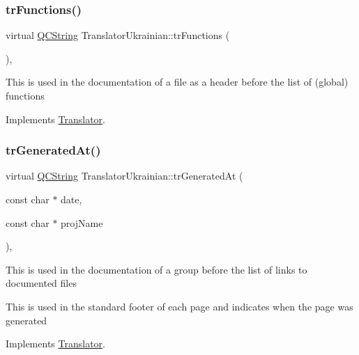 \subsubsection{\texorpdfstring{trFunctions()}{trFunctions()}}
{\footnotesize\ttfamily virtual \mbox{\hyperlink{class_q_c_string}{Q\+C\+String}} Translator\+Ukrainian\+::tr\+Functions (\begin{DoxyParamCaption}{ }\end{DoxyParamCaption})\hspace{0.3cm}{\ttfamily [inline]}, {\ttfamily [virtual]}}

This is used in the documentation of a file as a header before the list of (global) functions 

Implements \mbox{\hyperlink{class_translator}{Translator}}.

\mbox{\label{class_translator_ukrainian_a36a14755f41ef1fcfa15794ec4049b81}} 
\subsubsection{\texorpdfstring{trGeneratedAt()}{trGeneratedAt()}}
{\footnotesize\ttfamily virtual \mbox{\hyperlink{class_q_c_string}{Q\+C\+String}} Translator\+Ukrainian\+::tr\+Generated\+At (\begin{DoxyParamCaption}\item[{const char $\ast$}]{date,  }\item[{const char $\ast$}]{proj\+Name }\end{DoxyParamCaption})\hspace{0.3cm}{\ttfamily [inline]}, {\ttfamily [virtual]}}

This is used in the documentation of a group before the list of links to documented files

This is used in the standard footer of each page and indicates when the page was generated 

Implements \mbox{\hyperlink{class_translator}{Translator}}.

\mbox{\label{class_translator_ukrainian_a6fa36de66f50890e87fb72859e12bf93}} 
